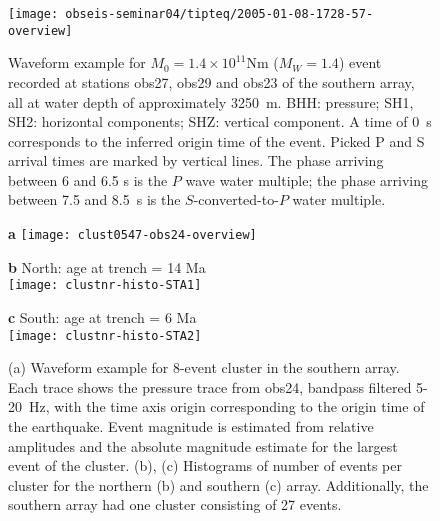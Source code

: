 \documentclass[reviewcopy]{elsart}
\renewcommand{\includegraphics}[2][]{\fbox{#2}}
\begin{document}
\begin{figure}
\centering
\texttt{[image: obseis-seminar04/tipteq/2005-01-08-1728-57-overview]}
\caption{Waveform example for $M_0=1.4\times 10^{11}$Nm ($M_W=1.4$)
  event recorded at stations obs27, obs29 and obs23 of the southern
  array, all at water depth of approximately 3250~m. BHH: pressure;
  SH1, SH2: horizontal components; SHZ: vertical component. A time of
  0~s corresponds to the inferred origin time of the event.  Picked P
  and S arrival times are marked by vertical lines. The phase arriving
  between 6 and 6.5 s is the $P$ wave water multiple; the phase
  arriving between 7.5 and 8.5~s is the $S$-converted-to-$P$ water
  multiple. %
}
\label{fig:waveform}
\end{figure}


\begin{figure}
{\sf \bf a}
\texttt{[image: clust0547-obs24-overview]}\\[1cm]

\parbox{0.5\textwidth}{{\sf \bf b} North: age at trench = 14 Ma \\
\texttt{[image: clustnr-histo-STA1]}}
\parbox{0.5\textwidth}{{\sf \bf c} South:  age at trench = 6 Ma\\
\texttt{[image: clustnr-histo-STA2]}}

\caption{(a) Waveform example for 8-event cluster in the southern
  array.  Each trace shows the pressure trace from obs24, bandpass
  filtered 5-20~Hz, with the time axis origin corresponding to the
  origin time of the earthquake.  Event magnitude is estimated from
  relative amplitudes and the absolute magnitude estimate for
  the largest event of the
cluster. (b), (c) Histograms of number of events per cluster for the northern
(b) and southern (c) array. Additionally, the southern array had one
cluster consisting of 27 events.}
\label{fig:clust-waveform-histo}
\end{figure}
\end{document}
